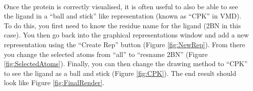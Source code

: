     \paragraph{}
        Once the protein is correctly visualised, it is often useful to also be able to see the ligand in a \enquote{ball and stick} like representation (known as \enquote{CPK} in VMD). To do this, you first need to know the residue name for the ligand (2BN in this case). You then go back into the graphical representations window and add a new representation using the \enquote{Create Rep} button (Figure \ref{fig:NewRep}). From there you change the selected atoms from \enquote{all} to \enquote{resname 2BN} (Figure \ref{fig:SelectedAtoms}). Finally, you can then change the drawing method to \enquote{CPK} to see the ligand as a ball and stick (Figure \ref{fig:CPK}). The end result should look like Figure \ref{fig:FinalRender}.

